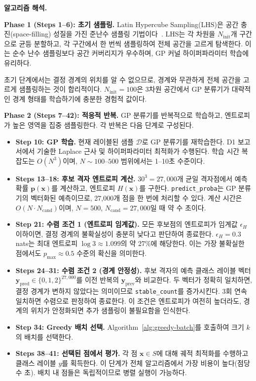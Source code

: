 \documentclass[11pt]{article}
\begin{document}
\textbf{알고리즘 해석.}

\textbf{Phase 1 (Steps 1--6): 초기 샘플링.} Latin Hypercube Sampling(LHS)은 공간 충진(space-filling) 성질을 가진 준난수 샘플링 기법이다~\cite{McKay1979}. LHS는 각 차원을 $N_{\text{init}}$개 구간으로 균등 분할하고, 각 구간에서 한 번씩 샘플링하여 전체 공간을 고르게 탐색한다. 이는 순수 난수 샘플링보다 공간 커버리지가 우수하며, GP 커널 하이퍼파라미터 학습에 유리하다.

초기 단계에서는 결정 경계의 위치를 알 수 없으므로, 경계와 무관하게 전체 공간을 고르게 샘플링하는 것이 합리적이다. $N_{\text{init}} = 100$은 3차원 공간에서 GP 분류기가 대략적인 경계 형태를 학습하기에 충분한 경험적 값이다.

\textbf{Phase 2 (Steps 7--42): 적응적 반복.} GP 분류기를 반복적으로 학습하고, 엔트로피가 높은 영역을 집중 샘플링한다. 각 반복은 다음 단계로 구성된다.

\begin{itemize}
  \item \textbf{Step 10: GP 학습.} 현재 레이블된 샘플 $\mathcal{D}$로 GP 분류기를 재학습한다. D1 보고서에서 기술한 Laplace 근사 및 하이퍼파라미터 최적화가 수행된다. 학습 시간 복잡도는 $O(N^3)$이며, $N \sim 100$--$500$ 범위에서는 1--10초 수준이다.

  \item \textbf{Steps 13--18: 후보 격자 엔트로피 계산.} $30^3 = 27{,}000$개 균일 격자점에서 예측 확률 $\mathbf{p}(\mathbf{x})$를 계산하고, 엔트로피 $H(\mathbf{x})$를 구한다. \texttt{predict\_proba}는 GP 분류기의 벡터화된 예측이므로, 27{,}000개 점을 한 번에 처리할 수 있다. 계산 시간은 $O(N \cdot N_{\text{cand}})$이며, $N = 500$, $N_{\text{cand}} = 27{,}000$일 때 약 수 초이다.

  \item \textbf{Step 21: 수렴 조건 1 (엔트로피 임계값).} 모든 후보점의 엔트로피가 임계값 $\epsilon_H$ 이하이면, 결정 경계의 불확실성이 충분히 낮다고 판단하여 종료한다. $\epsilon_H = 0.3$ nats는 최대 엔트로피 $\log 3 \approx 1.099$의 약 27\%에 해당한다. 이는 가장 불확실한 점에서도 $p_{\text{max}} \approx 0.5$ 수준의 확신을 의미한다.

  \item \textbf{Steps 24--31: 수렴 조건 2 (경계 안정성).} 후보 격자의 예측 클래스 레이블 벡터 $\mathbf{y}_{\text{pred}} \in \{0,1,2\}^{27{,}000}$를 이전 반복의 $\mathbf{y}_{\text{prev}}$와 비교한다. 두 벡터가 정확히 일치하면, 결정 경계가 변하지 않았다는 의미이므로 \texttt{stable\_count}를 증가시킨다. 3회 연속 일치하면 수렴으로 판정하여 종료한다. 이 조건은 엔트로피가 여전히 높더라도, 경계의 위치가 안정화되면 추가 샘플링이 불필요함을 인식한다.

  \item \textbf{Step 34: Greedy 배치 선택.} Algorithm~\ref{alg:greedy-batch}를 호출하여 크기 $k$의 배치를 선택한다.

  \item \textbf{Steps 38--41: 선택된 점에서 평가.} 각 점 $\mathbf{x} \in S$에 대해 궤적 최적화를 수행하고 클래스 레이블 $y$를 획득한다. 이 단계가 전체 알고리즘에서 가장 비용이 높다(점당 수 초). 배치 내 점들은 독립적이므로 병렬 실행이 가능하다.
\end{itemize}
\end{document}
